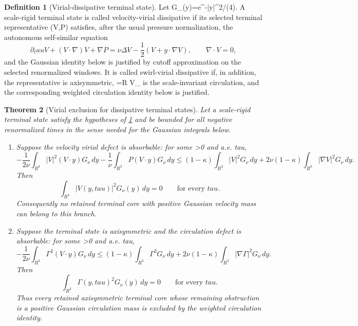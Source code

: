 \documentclass[11pt]{amsart}
\def\({}%
\def\){}%
\def\mathbb#1{#1}%
\def\tau{tau}%
\theoremstyle{plain}
\newtheorem{theorem}{Theorem}[section]
\theoremstyle{definition}
\newtheorem{definition}[theorem]{Definition}
\theoremstyle{remark}
\begin{document}
\begin{definition}[Virial-dissipative terminal state]
\label{paper6:def:virial-dissipative}
Let \(G_\nu(y)=e^{-|y|^2/(4\nu)}\).  A scale-rigid terminal state is called
velocity-virial dissipative if its selected terminal representative
\((V,P)\) satisfies, after the usual pressure normalization, the autonomous
self-similar equation
\[
  \partial_\tau V+(V\cdot\nabla)V+\nabla P
  =
  \nu\Delta V-\frac12(V+y\cdot\nabla V),
  \qquad \nabla\cdot V=0,
\]
and the Gaussian identity below is justified by cutoff approximation on the
selected renormalized windows.  It is called swirl-virial dissipative if, in
addition, the representative is axisymmetric, \(\Gamma=R V_\theta\) is the
scale-invariant circulation, and the corresponding weighted circulation
identity below is justified.
\end{definition}

\begin{theorem}[Virial exclusion for dissipative terminal states]
\label{paper6:thm:virial-exclusion}
Let a scale-rigid terminal state satisfy the hypotheses of
\cref{paper6:def:virial-dissipative} and be bounded for all negative renormalized
times in the sense needed for the Gaussian integrals below.

\begin{enumerate}[label=\textup{(\alph*)}]
\item Suppose the velocity virial defect is absorbable: for some
\(\kappa>0\) and a.e. \(\tau\),
\[
  -\frac{1}{2\nu}\int_{\mathbb R^3}|V|^2(V\cdot y)G_\nu\,dy
  -\frac1\nu\int_{\mathbb R^3}P(V\cdot y)G_\nu\,dy
  \le
  (1-\kappa)\int_{\mathbb R^3}|V|^2G_\nu\,dy
  +2\nu(1-\kappa)\int_{\mathbb R^3}|\nabla V|^2G_\nu\,dy .
\]
Then
\[
  \int_{\mathbb R^3}|V(y,\tau)|^2G_\nu(y)\,dy=0
  \qquad\text{for every }\tau.
\]
Consequently no retained terminal core with positive Gaussian velocity mass can
belong to this branch.

\item Suppose the terminal state is axisymmetric and the circulation defect is
absorbable: for some \(\kappa>0\) and a.e. \(\tau\),
\[
  -\frac{1}{2\nu}\int_{\mathbb R^3}\Gamma^2(V\cdot y)G_\nu\,dy
  \le
  (1-\kappa)\int_{\mathbb R^3}\Gamma^2G_\nu\,dy
  +2\nu(1-\kappa)\int_{\mathbb R^3}|\nabla \Gamma|^2G_\nu\,dy .
\]
Then
\[
  \int_{\mathbb R^3}\Gamma(y,\tau)^2G_\nu(y)\,dy=0
  \qquad\text{for every }\tau.
\]
Thus every retained axisymmetric terminal core whose remaining obstruction is a
positive Gaussian circulation mass is excluded by the weighted circulation
identity.
\end{enumerate}
\end{theorem}
\end{document}

